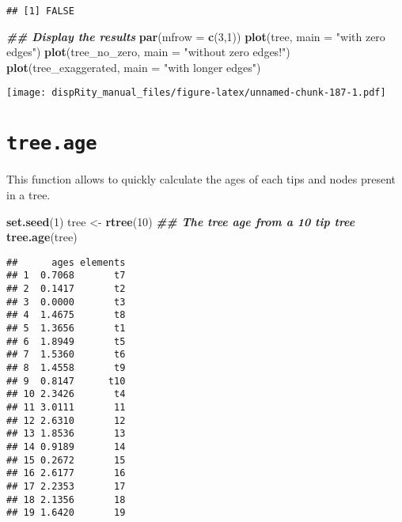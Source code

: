 \documentclass[
]{book}
\newenvironment{Shaded}{\begin{snugshade}}{\end{snugshade}}
\newcommand{\AttributeTok}[1]{\textcolor[rgb]{0.13,0.29,0.53}{#1}}
\newcommand{\DecValTok}[1]{\textcolor[rgb]{0.00,0.00,0.81}{#1}}
\newcommand{\DocumentationTok}[1]{\textcolor[rgb]{0.56,0.35,0.01}{\textbf{\textit{#1}}}}
\newcommand{\FunctionTok}[1]{\textcolor[rgb]{0.13,0.29,0.53}{\textbf{#1}}}
\newcommand{\NormalTok}[1]{#1}
\newcommand{\OtherTok}[1]{\textcolor[rgb]{0.56,0.35,0.01}{#1}}
\newcommand{\StringTok}[1]{\textcolor[rgb]{0.31,0.60,0.02}{#1}}
\begin{document}
\begin{verbatim}
## [1] FALSE
\end{verbatim}

\begin{Shaded}
\begin{Highlighting}[]
\DocumentationTok{\#\# Display the results}
\FunctionTok{par}\NormalTok{(}\AttributeTok{mfrow =} \FunctionTok{c}\NormalTok{(}\DecValTok{3}\NormalTok{,}\DecValTok{1}\NormalTok{))}
\FunctionTok{plot}\NormalTok{(tree, }\AttributeTok{main =} \StringTok{"with zero edges"}\NormalTok{)}
\FunctionTok{plot}\NormalTok{(tree\_no\_zero, }\AttributeTok{main =} \StringTok{"without zero edges!"}\NormalTok{)}
\FunctionTok{plot}\NormalTok{(tree\_exaggerated, }\AttributeTok{main =} \StringTok{"with longer edges"}\NormalTok{)}
\end{Highlighting}
\end{Shaded}

\texttt{[image: dispRity\_manual\_files/figure-latex/unnamed-chunk-187-1.pdf]}

\hypertarget{tree.age}{%
\section{\texorpdfstring{\texttt{tree.age}}{tree.age}}\label{tree.age}}

This function allows to quickly calculate the ages of each tips and nodes present in a tree.

\begin{Shaded}
\begin{Highlighting}[]
\FunctionTok{set.seed}\NormalTok{(}\DecValTok{1}\NormalTok{)}
\NormalTok{tree }\OtherTok{\textless{}{-}} \FunctionTok{rtree}\NormalTok{(}\DecValTok{10}\NormalTok{)}
\DocumentationTok{\#\# The tree age from a 10 tip tree}
\FunctionTok{tree.age}\NormalTok{(tree)}
\end{Highlighting}
\end{Shaded}

\begin{verbatim}
##      ages elements
## 1  0.7068       t7
## 2  0.1417       t2
## 3  0.0000       t3
## 4  1.4675       t8
## 5  1.3656       t1
## 6  1.8949       t5
## 7  1.5360       t6
## 8  1.4558       t9
## 9  0.8147      t10
## 10 2.3426       t4
## 11 3.0111       11
## 12 2.6310       12
## 13 1.8536       13
## 14 0.9189       14
## 15 0.2672       15
## 16 2.6177       16
## 17 2.2353       17
## 18 2.1356       18
## 19 1.6420       19
\end{verbatim}
\end{document}
